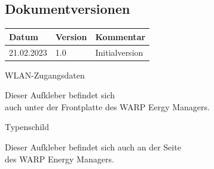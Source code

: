 \documentclass[a4paper,10pt]{article}
\begin{document}
\begin{multicols*}{2}
	\section{Dokumentversionen}
	\begin{tabular}{lll}
		\toprule
		Datum      & Version & Kommentar                       \\
		\midrule
		21.02.2023 & 1.0     & Initialversion                  \\
		\bottomrule
	\end{tabular}

	\vfill
	\null

	\columnbreak
\appendix



	\newpage
	\pagestyle{empty}
	\null
	\vfill
	WLAN-Zugangsdaten
	\begin{tcolorbox}[width=4.2cm,height=2.7cm, boxrule=0.25mm]

	\end{tcolorbox}
	Dieser Aufkleber befindet sich\\ auch unter der Frontplatte des WARP Eergy
	Managers.
	\columnbreak

	\null
	\vfill
	Typenschild
	\begin{tcolorbox}[width=7.8cm,height=4.1cm, boxrule=0.25mm]

	\end{tcolorbox}
	Dieser Aufkleber befindet sich auch an der Seite\\ des WARP Energy Managers.
\end{multicols*}
\end{document}
